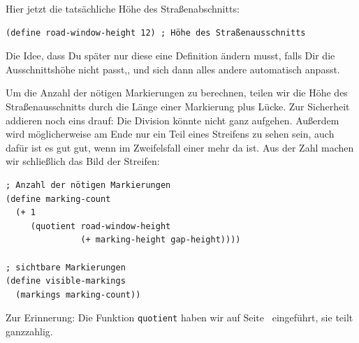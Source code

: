 %
Hier jetzt die tatsächliche Höhe des Straßenabschnitts:
%
\begin{lstlisting}
(define road-window-height 12) ; Höhe des Straßenausschnitts
\end{lstlisting}
%
Die Idee, dass Du später nur diese eine Definition ändern musst, falls
Dir die Ausschnittshöhe nicht passt,, und sich dann alles andere
automatisch anpasst.

Um die Anzahl der nötigen Markierungen zu berechnen, teilen wir die
Höhe des Straßenausschnitts durch die Länge einer Markierung plus
Lücke.  Zur Sicherheit addieren noch eins drauf: Die Division könnte
nicht ganz aufgehen.  Außerdem wird möglicherweise am Ende nur ein
Teil eines Streifens zu sehen sein, auch dafür ist es gut gut, wenn im
Zweifelsfall einer mehr da ist.  Aus der Zahl machen wir schließlich
das Bild der Streifen:
%
\begin{lstlisting}
; Anzahl der nötigen Markierungen
(define marking-count
  (+ 1
     (quotient road-window-height
               (+ marking-height gap-height))))

; sichtbare Markierungen
(define visible-markings
  (markings marking-count))
\end{lstlisting}
%
Zur Erinnerung: Die Funktion \lstinline{quotient} haben wir auf
Seite~\pageref{func:quotient} eingeführt, sie teilt ganzzahlig.

